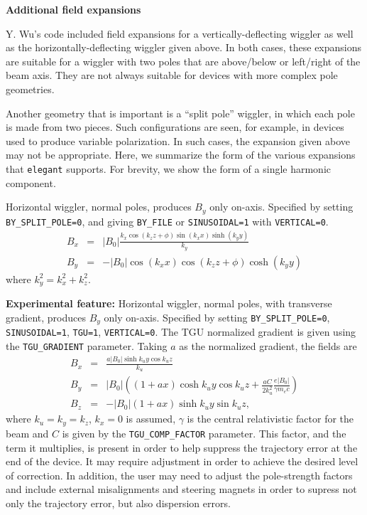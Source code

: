{\bf Additional field expansions}

Y. Wu's code included field expansions for a vertically-deflecting
wiggler as well as the horizontally-deflecting wiggler given above.
In both cases, these expansions are suitable for a wiggler with two
poles that are above/below or left/right of the beam axis.  They are
not always suitable for devices with more complex pole geometries.

Another geometry that is important is a ``split pole'' wiggler, in which
each pole is made from two pieces.  Such configurations are seen, for example,
in devices used to produce variable polarization.  In such cases, the
expansion given above may not be appropriate.  Here, we summarize the form of the
various expansions that {\tt elegant} supports.  For brevity, we show the
form of a single harmonic component.

Horizontal wiggler, normal poles, produces $B_y$ only on-axis.   Specified
by setting {\tt BY\_SPLIT\_POLE=0}, and giving {\tt BY\_FILE} or {\tt SINUSOIDAL=1} with {\tt VERTICAL=0}.
\begin{eqnarray}
B_x & = & \left|B_0\right| \frac{k_x \cos (k_z z + \phi) \sin (k_x x) \sinh (k_y y)}{k_y}\\
B_y & = & - \left|B_0\right| \cos (k_x x) \cos (k_z z + \phi) \cosh (k_y y)
\end{eqnarray}
where $k_y^2 = k_x^2 + k_z^2$.

{\bf Experimental feature:} Horizontal wiggler, normal poles, with transverse gradient, produces $B_y$ only on-axis.   Specified
by setting {\tt BY\_SPLIT\_POLE=0}, {\tt SINUSOIDAL=1}, {\tt TGU=1}, {\tt VERTICAL=0}.
The TGU normalized gradient is given using the \verb|TGU_GRADIENT| parameter.
Taking $a$ as the normalized gradient, the fields are\cite{RLindbergPC}
\begin{eqnarray}
B_x & = & \frac{a \left|B_0\right| \sinh k_u y \cos k_u z}{k_u} \\
B_y & = & \left|B_0\right| \left((1 + a x) \cosh k_u y \cos k_u z + \frac{a C }{2 k_u^2}\frac{e \left|B_0\right|}{\gamma m_e c }\right) \\
B_z & = & -\left|B_0\right| (1 + a x) \sinh k_u y \sin k_u z,
\end{eqnarray}
where $k_u = k_y = k_z$, $k_x = 0$ is assumed, $\gamma$ is the central relativistic factor for the beam and $C$ is given by the
\verb|TGU_COMP_FACTOR| parameter.
This factor, and the term it multiplies, is present in order to help suppress the 
trajectory error at the end of the device.
It may require adjustment in order to achieve the desired level of correction.
In addition, the user may need to adjust the pole-strength factors and include external misalignments
and steering magnets in order to supress not only the trajectory error, but also dispersion errors.

